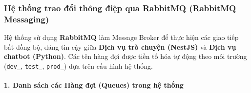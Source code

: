 \subsubsection{Hệ thống trao đổi thông điệp qua RabbitMQ (RabbitMQ Messaging)}

Hệ thống sử dụng \textbf{RabbitMQ} làm Message Broker để thực hiện các giao tiếp bất đồng bộ, đáng tin cậy giữa \textbf{Dịch vụ trò chuyện (NestJS)} và \textbf{Dịch vụ chatbot (Python)}. Các tên hàng đợi được tiền tố hóa tự động theo môi trường (\texttt{dev\_}, \texttt{test\_}, \texttt{prod\_}) dựa trên cấu hình hệ thống.

\paragraph{1. Danh sách các Hàng đợi (Queues) trong hệ thống}

